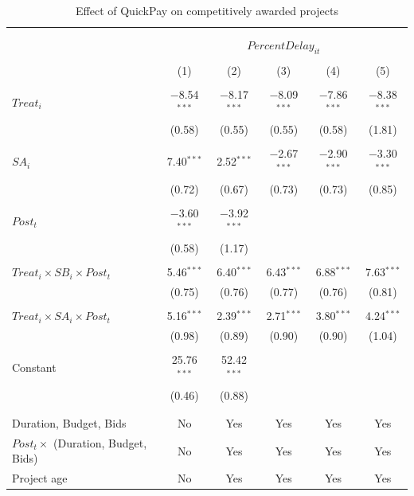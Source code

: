 \documentclass[
]{article}
\begin{document}
\begin{table}[H] \centering 
  \caption{Effect of QuickPay on competitively awarded projects} 
  \label{} 
\small 
\begin{tabular}{@{\extracolsep{-2pt}}lccccc} 
\\[-1.8ex]\hline 
\hline \\[-1.8ex] 
\\[-1.8ex] & \multicolumn{5}{c}{$PercentDelay_{it}$  } \\ 
\\[-1.8ex] & (1) & (2) & (3) & (4) & (5)\\ 
\hline \\[-1.8ex] 
 $Treat_i$ & $-$8.54$^{***}$ & $-$8.17$^{***}$ & $-$8.09$^{***}$ & $-$7.86$^{***}$ & $-$8.38$^{***}$ \\ 
  & (0.58) & (0.55) & (0.55) & (0.58) & (1.81) \\ 
  & & & & & \\ 
 $SA_i$ & 7.40$^{***}$ & 2.52$^{***}$ & $-$2.67$^{***}$ & $-$2.90$^{***}$ & $-$3.30$^{***}$ \\ 
  & (0.72) & (0.67) & (0.73) & (0.73) & (0.85) \\ 
  & & & & & \\ 
 $Post_t$ & $-$3.60$^{***}$ & $-$3.92$^{***}$ &  &  &  \\ 
  & (0.58) & (1.17) &  &  &  \\ 
  & & & & & \\ 
 $Treat_i \times SB_i \times Post_t$ & 5.46$^{***}$ & 6.40$^{***}$ & 6.43$^{***}$ & 6.88$^{***}$ & 7.63$^{***}$ \\ 
  & (0.75) & (0.76) & (0.77) & (0.76) & (0.81) \\ 
  & & & & & \\ 
 $Treat_i \times SA_i \times Post_t$ & 5.16$^{***}$ & 2.39$^{***}$ & 2.71$^{***}$ & 3.80$^{***}$ & 4.24$^{***}$ \\ 
  & (0.98) & (0.89) & (0.90) & (0.90) & (1.04) \\ 
  & & & & & \\ 
 Constant & 25.76$^{***}$ & 52.42$^{***}$ &  &  &  \\ 
  & (0.46) & (0.88) &  &  &  \\ 
  & & & & & \\ 
\hline \\[-1.8ex] 
Duration, Budget, Bids & No & Yes & Yes & Yes & Yes \\ 
$Post_t \times $  (Duration, Budget, Bids) & No & Yes & Yes & Yes & Yes \\ 
Project age & No & Yes & Yes & Yes & Yes \\ 

\end{tabular}
\end{table}
\end{document}
